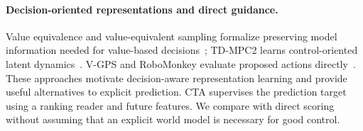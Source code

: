\paragraph{Decision-oriented representations and direct guidance.}
Value equivalence and value-equivalent sampling formalize preserving model information needed for value-based decisions~\cite{grimm2020value,arumugam2022deciding}; TD-MPC2 learns control-oriented latent dynamics~\cite{hansen2024tdmpc2}. V-GPS and RoboMonkey evaluate proposed actions directly~\cite{nakamoto2024vgps,kwok2025robomonkey}. These approaches motivate decision-aware representation learning and provide useful alternatives to explicit prediction. CTA supervises the prediction target using a ranking reader and future features. We compare with direct scoring without assuming that an explicit world model is necessary for good control.
